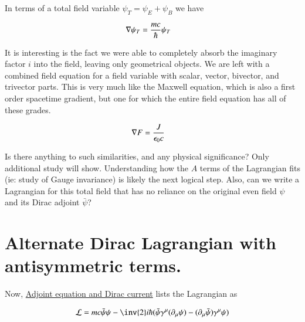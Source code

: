 \documentclass{article}
\begin{document}
In terms of a total field variable $\psi_T = \psi_E + \psi_B$ we have

\begin{align*}
\nabla \psi_T &= \frac{m c}{\hbar} \psi_T
\end{align*}

It is interesting is the fact we were able to completely absorb the imaginary factor $i$ into the field, leaving only geometrical objects.
We are left with a combined field equation for a field variable with scalar, vector, bivector, and trivector parts.  This is very much like the Maxwell equation, which is
also a first order spacetime gradient, but one for which the entire
field equation has all of these grades.

\begin{align*}
\nabla F &= \frac{J}{\epsilon_0 c}
\end{align*}

Is there anything to such similarities, and any physical significance?  Only additional study will show.  Understanding how the $A$ terms of the Lagrangian fits (ie: 
study of Gauge invariance) is likely the next logical step.
Also, can we write a Lagrangian for this total field that has no reliance on the original even field $\psi$
and its Dirac adjoint $\bar\psi$?

\section{ Alternate Dirac Lagrangian with antisymmetric terms. }

Now, 
\href{http://en.wikipedia.org/wiki/Dirac_equation#Adjoint_equation_and_Dirac_current}{Adjoint equation and Dirac current} lists the Lagrangian as

\begin{align*}
\LL = mc \bar{\psi}\psi - {\inv{2}i\hbar}(\bar{\psi}\gamma^\mu (\partial_\mu\psi) - (\partial_\mu\bar{\psi})\gamma^\mu \psi)
\end{align*}



\end{document}
